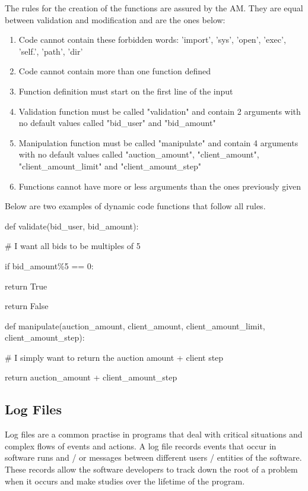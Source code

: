 \documentclass[a4paper]{article}
\begin{document}
\newpage
The rules for the creation of the functions are assured by the AM. They are equal between validation and modification and are the ones below:
\begin{enumerate}
\item Code cannot contain these forbidden words: 'import', 'sys', 'open', 'exec', 'self.', 'path', 'dir'
\item Code cannot contain more than one function defined
\item Function definition must start on the first line of the input
\item Validation function must be called "validation" and contain 2 arguments with no default values called "bid\_user" and "bid\_amount"
\item Manipulation function must be called "manipulate" and contain 4 arguments with no default values called "auction\_amount", "client\_amount", "client\_amount\_limit" and \newline"client\_amount\_step"
\item Functions cannot have more or less arguments than the ones previously given
\end{enumerate}

\indent 

Below are two examples of dynamic code functions that follow all rules.

def validate(bid\_user, bid\_amount):

\indent \indent \# I want all bids to be multiples of 5

\indent \indent if bid\_amount\%5 == 0:

\indent \indent \indent return True

\indent \indent return False

\indent 

def manipulate(auction\_amount, client\_amount, client\_amount\_limit, client\_amount\_step):

\indent \indent \# I simply want to return the auction amount + client step

\indent \indent return auction\_amount + client\_amount\_step

\subsection{Log Files}
\label{subsec:logfile}

Log files are a common practise in programs that deal with critical situations and complex flows of events and actions.
A log file records events that occur in software runs and / or messages between different users / entities of the software.
These records allow the software developers to track down the root of a problem when it occurs and make studies over the lifetime of the program.
\end{document}
